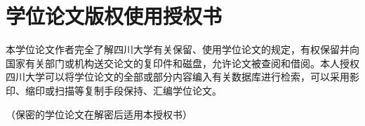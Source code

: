
\chapter{学位论文版权使用授权书}
本学位论文作者完全了解{四川大学}有关保留、使用学位论文的规定，有权保留并向国家有关部门或机构送交论文的复印件和磁盘，允许论文被查阅和借阅。本人授权{四川大学}可以将学位论文的全部或部分内容编入有关数据库进行检索，可以采用影印、缩印或扫描等复制手段保持、汇编学位论文。


（保密的学位论文在解密后适用本授权书）
\vspace{4cm}
\autograph

